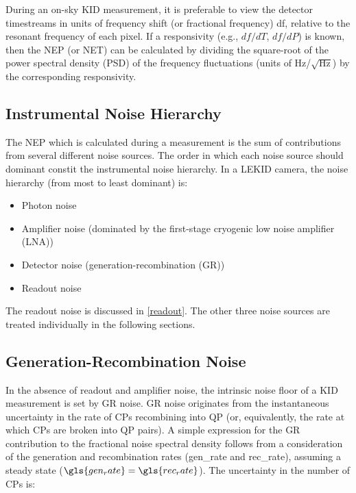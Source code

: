 During an on-sky KID measurement, it is preferable to view the detector timestreams in units of frequency shift (or fractional frequency) \gls{df}, relative to the resonant frequency of each pixel. If a responsivity (e.g., $df/dT$, $df/dP$) is known, then the NEP (or NET) can be calculated by dividing the square-root of the power spectral density (PSD) of the frequency fluctuations (units of Hz/$\sqrt{\mathrm{Hz}}$) by the corresponding responsivity.

\subsection{Instrumental Noise Hierarchy}

The NEP which is calculated during a measurement is the sum of contributions from several different noise sources. The order in which each noise source should dominant constit the instrumental noise hierarchy. In a LEKID camera, the noise hierarchy (from most to least dominant) is:

\begin{itemize}[nosep]
  \item Photon noise
  \item Amplifier noise (dominated by the first-stage cryogenic low noise amplifier (LNA))
  \item Detector noise (generation-recombination (GR))
  \item Readout noise
\end{itemize}

The readout noise is discussed in \ref{readout}. The other three noise sources are treated individually in the following sections.

\subsection{Generation-Recombination Noise}\label{ssec:GR noise}

In the absence of readout and amplifier noise, the intrinsic noise floor of a KID measurement is set by GR noise. GR noise originates from the instantaneous uncertainty in the rate of CPs recombining into QP (or, equivalently, the rate at which CPs are broken into QP pairs). A simple expression for the GR contribution to the fractional noise spectral density follows from a consideration of the generation and recombination rates (\gls{gen_rate} and \gls{rec_rate}), assuming a steady state ($\gls{gen_rate} = \gls{rec_rate}$). The uncertainty in the number of CPs is:


